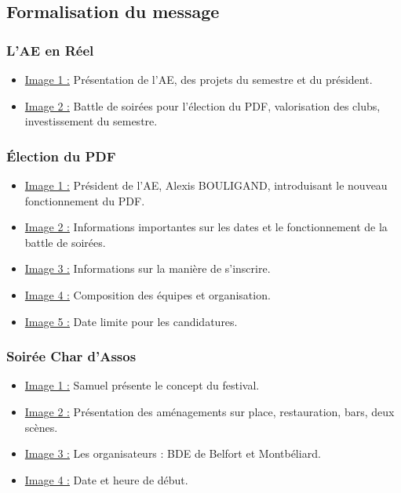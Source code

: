 
\subsection{Formalisation du message}\label{subsec:formalisation-du-message}

\subsubsection{L'AE en Réel}
\begin{itemize}
    \item \underline{Image 1 :} Présentation de l'\gls{AE}, des projets du semestre et du président.
    \item \underline{Image 2 :} Battle de soirées pour l'élection du PDF, valorisation des clubs, investissement du semestre.
\end{itemize}

\subsubsection{Élection du PDF}
\begin{itemize}
    \item \underline{Image 1 :} Président de l'AE, Alexis BOULIGAND, introduisant le nouveau fonctionnement du \gls{PDF}.
    \item \underline{Image 2 :} Informations importantes sur les dates et le fonctionnement de la battle de soirées.
    \item \underline{Image 3 :} Informations sur la manière de s'inscrire.
    \item \underline{Image 4 :} Composition des équipes et organisation.
    \item \underline{Image 5 :} Date limite pour les candidatures.
\end{itemize}

\subsubsection{Soirée Char d’Assos}
\begin{itemize}
    \item \underline{Image 1 :} Samuel présente le concept du festival.
    \item \underline{Image 2 :} Présentation des aménagements sur place, restauration, bars, deux scènes.
    \item \underline{Image 3 :} Les organisateurs : BDE de Belfort et Montbéliard.
    \item \underline{Image 4 :} Date et heure de début.
\end{itemize}

